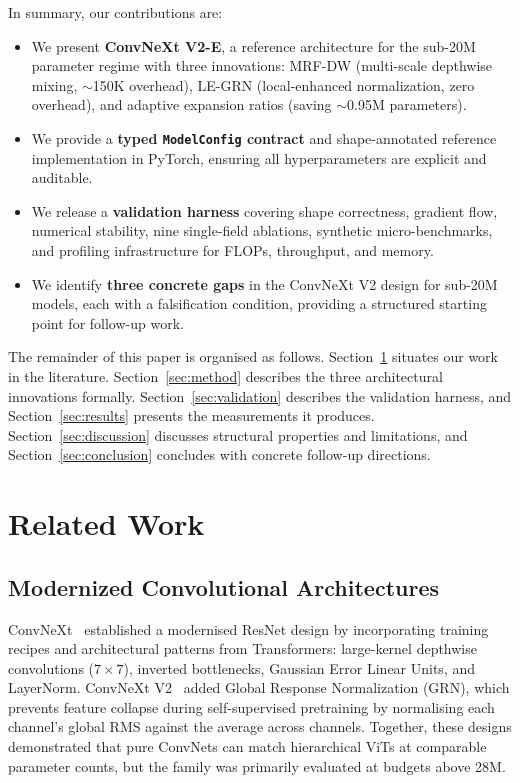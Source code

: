 \documentclass{article}
\begin{document}
In summary, our contributions are:

\begin{itemize}
  \item We present \textbf{ConvNeXt V2-E}, a reference architecture
        for the sub-20M parameter regime with three innovations: MRF-DW
        (multi-scale depthwise mixing, $\sim$150K overhead),
        LE-GRN (local-enhanced normalization, zero overhead), and
        adaptive expansion ratios (saving $\sim$0.95M parameters).
  \item We provide a \textbf{typed \texttt{ModelConfig} contract} and
        shape-annotated reference implementation in PyTorch, ensuring
        all hyperparameters are explicit and auditable.
  \item We release a \textbf{validation harness} covering shape
        correctness, gradient flow, numerical stability, nine
        single-field ablations, synthetic micro-benchmarks, and
        profiling infrastructure for FLOPs, throughput, and memory.
  \item We identify \textbf{three concrete gaps} in the ConvNeXt V2
        design for sub-20M models, each with a falsification condition,
        providing a structured starting point for follow-up work.
\end{itemize}

The remainder of this paper is organised as follows.
Section~\ref{sec:related} situates our work in the literature.
Section~\ref{sec:method} describes the three architectural innovations
formally.  Section~\ref{sec:validation} describes the validation
harness, and Section~\ref{sec:results} presents the measurements it
produces.  Section~\ref{sec:discussion} discusses structural properties
and limitations, and Section~\ref{sec:conclusion} concludes with
concrete follow-up directions.

\section{Related Work}
\label{sec:related}

\subsection{Modernized Convolutional Architectures}

ConvNeXt~\cite{liu2022convnext} established a modernised ResNet design
by incorporating training recipes and architectural patterns from
Transformers: large-kernel depthwise convolutions ($7\times7$), inverted
bottlenecks, Gaussian Error Linear Units, and LayerNorm.
ConvNeXt V2~\cite{woo2023convnextv2} added Global Response
Normalization (GRN), which prevents feature collapse during
self-supervised pretraining by normalising each channel's global RMS
against the average across channels.  Together, these designs
demonstrated that pure ConvNets can match hierarchical ViTs at
comparable parameter counts, but the family was primarily evaluated
at budgets above 28M.
\end{document}
